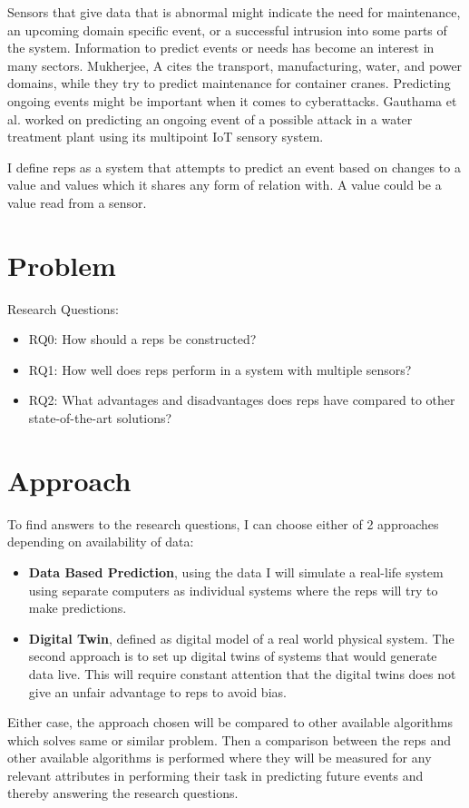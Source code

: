 \documentclass[a4paper,8pt]{article}
\begin{document}
		Sensors that give data that is abnormal might indicate the need for maintenance\cite{MUKHERJEE2024102444}, an upcoming domain specific event, or a successful intrusion into some parts of the system\cite{MR2022103046}. Information to predict events or needs has become an interest in many sectors. Mukherjee, A\cite{MUKHERJEE2024102444} cites the transport, manufacturing, water, and power domains, while they try to predict maintenance for container cranes. Predicting ongoing events might be important when it comes to cyberattacks. Gauthama et al. worked on predicting an ongoing event of a possible attack in a water treatment plant using its multipoint IoT sensory system\cite{MR2022103046}.
		
		I define \gls{reps} as a system that attempts to predict an event based on changes to a value and values which it shares any form of relation with. A value could be a value read from a sensor.

	\section{Problem}
		Research Questions:
		\begin{itemize}
			\item RQ0: How should a \gls{reps} be constructed?
			\item RQ1: How well does \gls{reps} perform in a system with multiple sensors?
			\item RQ2: What advantages and disadvantages does \gls{reps} have compared to other state-of-the-art solutions?
		\end{itemize}
	\newpage
	\section{Approach}
		To find answers to the research questions, I can choose either of 2 approaches depending on availability of data: 
		\begin{itemize}
			\item \textbf{Data Based Prediction}, using the data I will simulate a real-life system using separate computers as individual systems where the \gls{reps} will try to make predictions.
			\item \textbf{Digital Twin}, defined as digital model of a real world physical system. The second approach is to set up digital twins of systems that would generate data live. This will require constant attention that the digital twins does not give an unfair advantage to \gls{reps} to avoid bias.
		\end{itemize}
		Either case, the approach chosen will be compared to other available algorithms which solves same or similar problem.
		Then a comparison between the \gls{reps} and other available algorithms is performed where they will be measured for any relevant attributes in performing their task in predicting future events and thereby answering the research questions.
		
\end{document}
